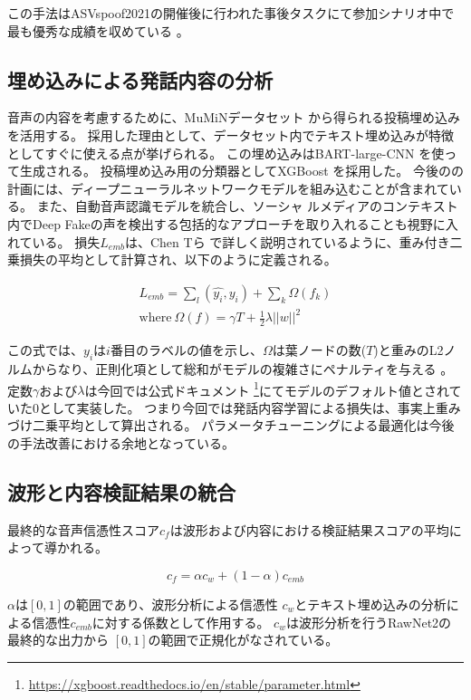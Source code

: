 この手法はASVspoof2021の開催後に行われた事後タスクにて参加シナリオ中で最も優秀な成績を収めている \cite{10155166}。

\subsection{埋め込みによる発話内容の分析}
音声の内容を考慮するために、MuMiNデータセット \cite{10.1145/3477495.3531744,NielsenMcConville2022}から得られる投稿埋め込みを活用する。
採用した理由として、データセット内でテキスト埋め込みが特徴としてすぐに使える点が挙げられる。
この埋め込みはBART-large-CNN \cite{lewis-etal-2020-bart}を使って生成される。
投稿埋め込み用の分類器としてXGBoost \cite{10.1145/2939672.2939785}を採用した。
今後のの計画には、ディープニューラルネットワークモデルを組み込むことが含まれている。
また、自動音声認識モデルを統合し、ソーシャ ルメディアのコンテキスト内でDeep Fakeの声を検出する包括的なアプローチを取り入れることも視野に入れている。
損失$L_{emb}$は、Chen Tら \cite{10.1145/2939672.2939785}で詳しく説明されているように、重み付き二乗損失の平均として計算され、以下のように定義される。

\begin{align} 
        L_{emb} = \sum_l (\hat{y_i}, y_i) + \sum_k \Omega (f_k) \\
        \text{where}~\Omega (f) = \gamma T + \frac{1}{2} \lambda ||w||^2
\end{align}

この式では、$y_i$は$i$番目のラベルの値を示し、$\Omega$は葉ノードの数($T$)と重みのL2ノルムからなり、正則化項として総和がモデルの複雑さにペナルティを与える \cite{10.1145/2939672.2939785}。
定数$\gamma$および$\lambda$は今回では公式ドキュメント \footnote{\url{https://xgboost.readthedocs.io/en/stable/parameter.html}}にてモデルのデフォルト値とされていた0として実装した。
つまり今回では発話内容学習による損失は、事実上重みづけ二乗平均として算出される。
パラメータチューニングによる最適化は今後の手法改善における余地となっている。

\subsection{波形と内容検証結果の統合}
最終的な音声信憑性スコア$c_f$は波形および内容における検証結果スコアの平均によって導かれる。

\begin{equation}
    c_f = \alpha c_w + (1 - \alpha) c_{emb}
\end{equation}

$\alpha$は$[0, 1]$の範囲であり、波形分析による信憑性 $c_w$とテキスト埋め込みの分析による信憑性$c_{emb}$に対する係数として作用する。
$c_w$は波形分析を行うRawNet2の最終的な出力から $[0,1]$の範囲で正規化がなされている。

